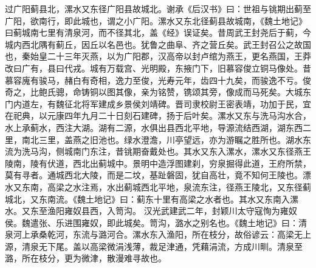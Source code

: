 \documentclass[12pt,UTF8]{ctexbook}
\begin{document}
过广阳蓟县北，漯水又东径广阳县故城北。谢承《后汉书》曰：世祖与铫期出蓟至广阳，欲南行，即此城也，谓之小广阳。漯水又东北径蓟县故城南，《魏土地记》曰蓟城南七里有清泉河，而不径其北，盖《经》误证矣。昔周武王封尧后于蓟，今城内西北隅有蓟丘，因丘以名邑也。犹鲁之曲阜、齐之营丘矣。武王封召公之故国也，秦始皇二十三年灭燕，以为广阳郡，汉高帝以封卢绾为燕王，更名燕国，王莽改曰广有，县曰代戎。城有万载宫、光明殿，东掖门下，旧慕容俊立铜马像处。昔慕容廆有骏马，赭白有奇相，逸力至俊，光寿元年，齿四十九矣，而骏逸不亏。俊奇之，比鲍氏骢，命铸铜以图其像，亲为铭赞，镌颂其旁，像成而马死矣。大城东门内道左，有魏征北将军建成乡景侯刘靖碑。晋司隶校尉王密表靖，功加于民，宜在祀典，以元康四年九月二十日刻石建碑，扬于后叶矣。漯水又东与洗马沟水合，水上承蓟水，西注大湖。湖有二源，水俱出县西北平地，导源流结西湖，湖东西二里，南北三里，盖燕之旧池也。绿水澄澹，川亭望远，亦为游瞩之胜所也。湖水东流为洗马沟，侧城南门东注，昔铫期奋戴处也。其水又东入漯水，漯水又东径燕王陵南，陵有伏道，西北出蓟城中。景明中造浮图建刹，穷泉掘得此道，王府所禁，莫有寻者。通城西北大陵，而是二坟，基趾磐固，犹自高壮，竟不知何王陵也。漂水又东南，高梁之水注焉，水出蓟城西北平地，泉流东注，径燕王陵北，又东径蓟城北，又东南流。《魏土地记》曰：蓟东十里有高梁之水者也。其水又东南入漯水。又东至渔阳雍奴县西，入笥沟。
汉光武建武二年，封颖川太守寇恂为雍奴侯。魏遣张、乐进围雍奴，即此城矣。笥沟，潞水之别名也。《魏土地记》曰：清泉河上承桑乾河，东流与潞河合。漯水东入渔阳，所在枝分，故俗谚云：高梁无上源，清泉无下尾。盖以高梁微涓浅薄，裁足津通，凭藉涓流，方成川甽。清泉至潞，所在枝分，更为微津，散漫难寻故也。
\end{document}

